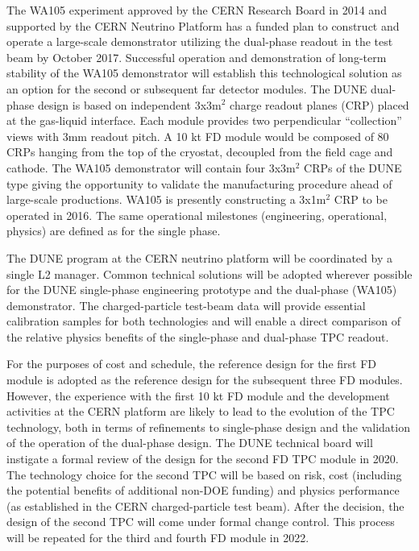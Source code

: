 The WA105 experiment approved by the CERN Research Board in 2014 and supported 
by the CERN Neutrino Platform has a funded plan to construct and operate a large-scale 
demonstrator utilizing the dual-phase readout in the test beam by October 2017. 
Successful operation and demonstration of long-term stability of the WA105 demonstrator 
will establish this technological solution as an option for the second or subsequent 
far detector modules. The DUNE dual-phase design is based on independent 3x3m$^2$
charge readout planes (CRP) placed at the gas-liquid interface. Each module provides 
two perpendicular ``collection'' views with 3mm readout pitch. A 10 kt FD module 
would be composed of 80 CRPs hanging from the top of the cryostat, decoupled from 
the field cage and cathode. The WA105 demonstrator will contain four 3x3m$^2$ 
CRPs of the DUNE type giving the opportunity to validate the manufacturing procedure 
ahead of large-scale productions. WA105 is presently constructing a 3x1m$^2$ 
CRP to be operated in 2016. The same operational milestones (engineering, operational, 
physics) are defined as for the single phase.

The DUNE program at the CERN neutrino platform will be coordinated by a single 
L2 manager. Common technical solutions will be adopted wherever possible for the 
DUNE single-phase engineering prototype and the dual-phase (WA105) demonstrator. 
The charged-particle test-beam data will provide essential calibration samples 
for both technologies and will enable a direct comparison of the relative physics 
benefits of the single-phase and dual-phase TPC readout. 


For the purposes of cost and schedule, the reference design for the first FD module 
is adopted as the reference design for the subsequent three FD modules. However, 
the experience with the first 10 kt FD module and the development activities at 
the CERN platform are likely to lead to the evolution of the TPC technology, both 
in terms of refinements to single-phase design and the validation of the operation 
of the dual-phase design. The DUNE technical board will instigate a formal review 
of the design for the second FD TPC module in 2020. The technology choice for the 
second TPC will be based on risk, cost (including the potential benefits of additional 
non-DOE funding) and physics performance (as established in the CERN charged-particle 
test beam). After the decision, the design of the second TPC will come under formal 
change control. This process will be repeated for the third and fourth FD module 
in 2022.

